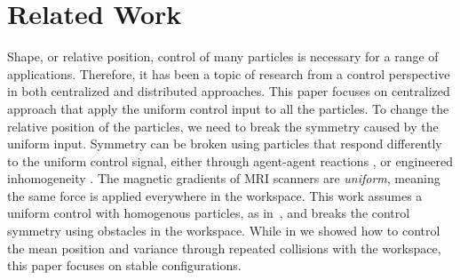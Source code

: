 
\section{Related Work}\label{sec:RelatedWork}

Shape, or relative position, control of many particles is necessary for a range of applications. Therefore, it has been a topic of research from a control perspective in both centralized and distributed approaches. 
 This paper focuses on centralized approach that apply the uniform control input to all the particles. To change the relative position of the particles, we need to break the symmetry caused by the uniform input.
Symmetry can be broken using particles that respond differently to the uniform control signal, either through agent-agent reactions \cite{bertozzi2015ring}, or engineered inhomogeneity  \cite{Donald2013,bretl2007,beckerIJRR2014}. 
 The magnetic gradients of MRI scanners are \emph{uniform}, meaning the same force is applied everywhere in the workspace\cite{nosrati2018development}.
 This work assumes a uniform control with homogenous particles, as in~\cite{AaronManipulation2013}, and breaks the control symmetry using obstacles in the workspace. 
  While in \cite{shahrokhi2018TRO} we showed how to control the mean position and variance through repeated collisions with the workspace, this paper focuses on stable configurations. 

